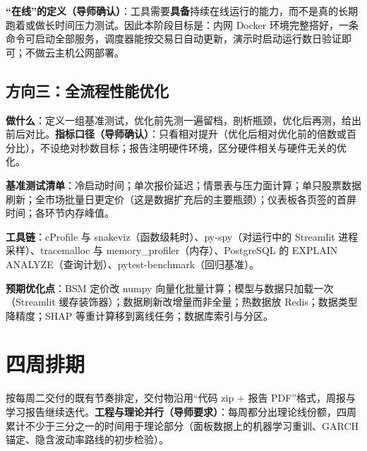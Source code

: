 \documentclass[11pt]{ctexart}
\begin{document}
\textbf{“在线”的定义（导师确认）}：工具需要\textbf{具备}持续在线运行的能力，而不是真的长期跑着或做长时间压力测试。因此本阶段目标是：内网 Docker 环境完整搭好，一条命令可启动全部服务，调度器能按交易日自动更新，演示时启动运行数日验证即可；不做云主机公网部署。

\subsection{方向三：全流程性能优化}

\textbf{做什么}：定义一组基准测试，优化前先测一遍留档，剖析瓶颈，优化后再测，给出前后对比。\textbf{指标口径（导师确认）}：只看相对提升（优化后相对优化前的倍数或百分比），不设绝对秒数目标；报告注明硬件环境，区分硬件相关与硬件无关的优化。

\textbf{基准测试清单}：冷启动时间；单次报价延迟；情景表与压力面计算；单只股票数据刷新；全市场批量日更定价（这是数据扩充后的主要瓶颈）；仪表板各页签的首屏时间；各环节内存峰值。

\textbf{工具链}：cProfile 与 snakeviz（函数级耗时）、py-spy（对运行中的 Streamlit 进程采样）、tracemalloc 与 memory\_profiler（内存）、PostgreSQL 的 EXPLAIN ANALYZE（查询计划）、pytest-benchmark（回归基准）。

\textbf{预期优化点}：BSM 定价改 numpy 向量化批量计算；模型与数据只加载一次（Streamlit 缓存装饰器）；数据刷新改增量而非全量；热数据放 Redis；数据类型降精度；SHAP 等重计算移到离线任务；数据库索引与分区。

\section{四周排期}

按每周二交付的既有节奏排定，交付物沿用“代码 zip + 报告 PDF”格式，周报与学习报告继续迭代。\textbf{工程与理论并行（导师要求）}：每周都分出理论线份额，四周累计不少于三分之一的时间用于理论部分（面板数据上的机器学习重训、GARCH 锚定、隐含波动率路线的初步检验）。
\end{document}
